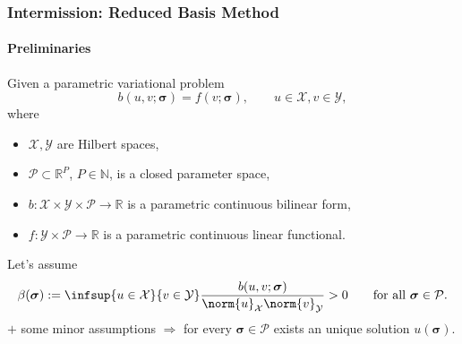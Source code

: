 \begin{frame}[t]
    \frametitle{Intermission: Reduced Basis Method}
    \framesubtitle{Preliminaries}

    Given a parametric variational problem
    \begin{equation}
        b(u, v; \bm \sigma) = f(v; \bm \sigma), \qquad u \in \mathcal X, v \in \mathcal Y,
    \end{equation}
    where
    \begin{itemize}
        \item $\mathcal X, \mathcal Y$ are Hilbert spaces,
        \item $\mathcal P \subset \mathbb{R}^{P}$, $P \in \mathbb{N}$, is a closed parameter space,
        \item $b \colon \mathcal X \times \mathcal Y \times \mathcal P \to \mathbb{R}$ is a parametric continuous bilinear form,
        \item $f \colon \mathcal Y \times \mathcal P \to \mathbb{R}$ is a parametric continuous linear functional.
    \end{itemize}

    Let's assume
    \begin{equation}
        \beta(\bm \sigma) := \infsup{u \in \mathcal X}{v \in \mathcal Y} \frac{b(u, v; \bm \sigma)}{\norm{u}_{\mathcal X}\norm{v}_{\mathcal Y}}  > 0 \qquad \text{for all } \bm \sigma \in \mathcal P.
    \end{equation}
    $+$ some minor assumptions $\Rightarrow$ for every $\bm \sigma \in \mathcal P$ exists an unique solution $u(\bm \sigma)$.
\end{frame}

